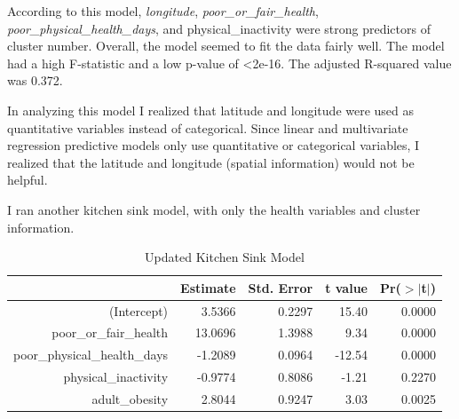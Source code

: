 \documentclass[12pt,twoside]{amherstthesis}
\begin{document}
  According to this model, \emph{longitude},
  \emph{poor\_or\_fair\_health}, \emph{poor\_physical\_health\_days}, and
  physical\_inactivity were strong predictors of cluster number. Overall,
  the model seemed to fit the data fairly well. The model had a high
  F-statistic and a low p-value of \textless{}2e-16. The adjusted
  R-squared value was 0.372.
  
  In analyzing this model I realized that latitude and longitude were used
  as quantitative variables instead of categorical. Since linear and
  multivariate regression predictive models only use quantitative or
  categorical variables, I realized that the latitude and longitude
  (spatial information) would not be helpful.
  
  \begin{Shaded}
  \end{Shaded}
  
  I ran another kitchen sink model, with only the health variables and
  cluster information.
  
  \begin{Shaded}
  \begin{Highlighting}[]
  \StringTok{ }\OperatorTok{~}
  \end{Highlighting}
  \end{Shaded}
  
  \begin{table}[ht]
  \centering
  \begin{tabular}{rrrrr}
    \hline
   & Estimate & Std. Error & t value & Pr($>$$|$t$|$) \\ 
    \hline
  (Intercept) & 3.5366 & 0.2297 & 15.40 & 0.0000 \\ 
    poor\_or\_fair\_health & 13.0696 & 1.3988 & 9.34 & 0.0000 \\ 
    poor\_physical\_health\_days & -1.2089 & 0.0964 & -12.54 & 0.0000 \\ 
    physical\_inactivity & -0.9774 & 0.8086 & -1.21 & 0.2270 \\ 
    adult\_obesity & 2.8044 & 0.9247 & 3.03 & 0.0025 \\ 
     \hline
  \end{tabular}
  \caption{Updated Kitchen Sink Model} 
  \end{table}
  
\end{document}
